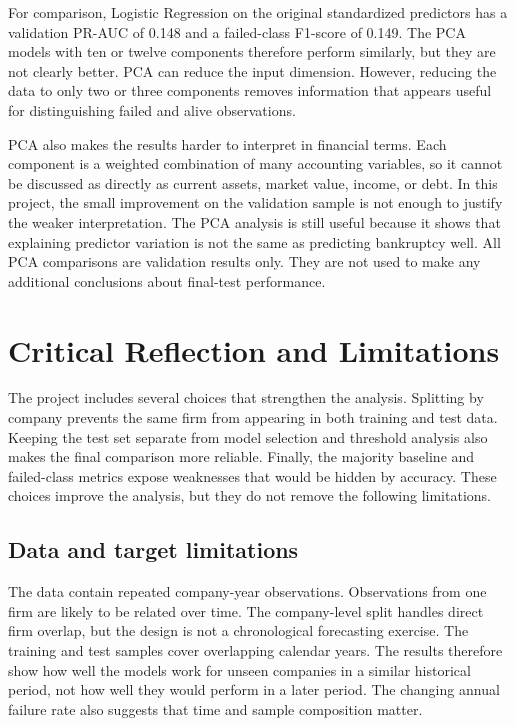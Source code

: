 \documentclass[11pt,a4paper]{article}
\begin{document}
For comparison, Logistic Regression on the original standardized predictors
has a validation PR-AUC of 0.148 and a failed-class F1-score of 0.149. The PCA
models with ten or twelve components therefore perform similarly, but they are
not clearly better. PCA can reduce the input dimension. However, reducing the
data to only two or three components removes information that appears useful
for distinguishing failed and alive observations.

PCA also makes the results harder to interpret in financial terms. Each component is a weighted
combination of many accounting variables, so it cannot be discussed as
directly as current assets, market value, income, or debt. In this project, the
small improvement on the validation sample is not enough to justify the weaker
interpretation. The PCA analysis is still useful because it shows that
explaining predictor variation is not the same as predicting bankruptcy well.
All PCA comparisons are validation results only. They are not used to make any
additional conclusions about final-test performance.

\section{Critical Reflection and Limitations}
\label{sec:limitations}

The project includes several choices that strengthen the analysis. Splitting by company prevents the
same firm from appearing in both training and test data. Keeping the test set
separate from model selection and threshold analysis also makes the final
comparison more reliable. Finally, the majority baseline and failed-class
metrics expose weaknesses that would be hidden by accuracy. These choices
improve the analysis, but they do not remove the following limitations.

\subsection{Data and target limitations}

The data contain repeated company-year observations. Observations from one firm
are likely to be related over time. The company-level split handles direct firm
overlap, but the design is not a chronological forecasting exercise. The
training and test samples cover overlapping calendar years. The results
therefore show how well the models work for unseen companies in a similar
historical period, not how well they would perform in a later period. The changing annual failure
rate also suggests that time and sample composition matter.
\end{document}
